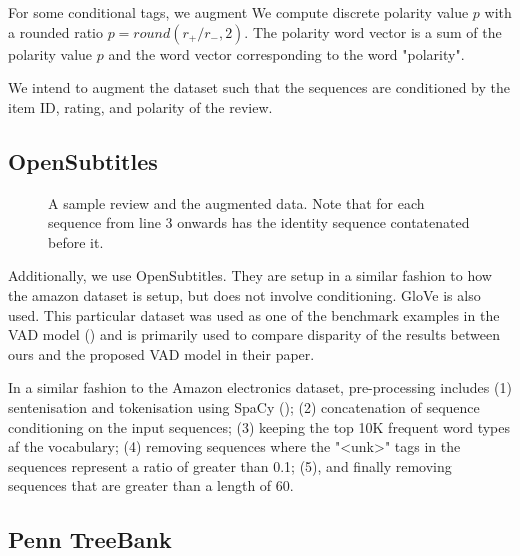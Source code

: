 \documentclass[12pt,twoside]{report}
\begin{document}
For some conditional tags, we augment 
We compute discrete polarity value $p$ with a rounded ratio $p=round(r_{+}/r_{-},2)$. The polarity word vector is a sum of the polarity value $p$ and the word vector corresponding to the word "polarity".


We intend to augment the dataset such that the sequences are conditioned by the item ID, rating, and polarity of the review.


\subsection{OpenSubtitles}

\begin{figure}[!ht]
	\centering
	
	
	\caption{A sample review and the augmented data. Note that for each sequence from line 3 onwards has the identity sequence contatenated before it. \label{aug_1}}
	\end{figure}

Additionally, we use OpenSubtitles. They are setup in a similar fashion to how the amazon dataset is setup, but does not involve conditioning. GloVe is also used. This particular dataset was used as one of the benchmark examples in the VAD model (\cite{du_variational_2018}) and is primarily used to compare disparity of the results between ours and the proposed VAD model in their paper.

In a similar fashion to the Amazon electronics dataset, pre-processing includes (1) sentenisation and tokenisation using SpaCy (\cite{honnibal_spacy_2017}); (2) concatenation of sequence conditioning on the input sequences; (3) keeping the top 10K frequent word types af the vocabulary; (4) removing sequences where the "<unk>" tags in the sequences represent a ratio of greater than 0.1; (5), and finally removing sequences that are greater than a length of 60. 


\subsection{Penn TreeBank}

\end{document}
